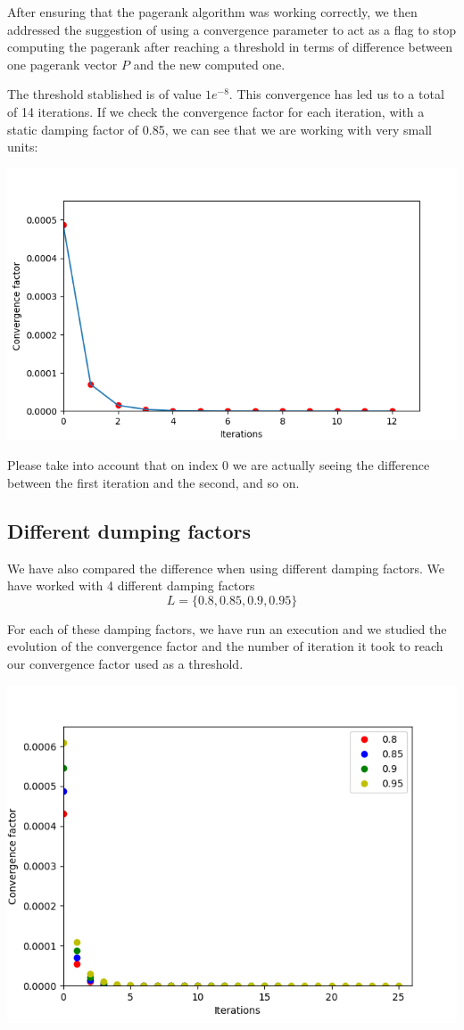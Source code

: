 \documentclass[10pt, a4paper]{article}
\begin{document}
\noindent After ensuring that the pagerank algorithm was working correctly, we then addressed the suggestion of using a convergence parameter to act as a flag to stop computing the pagerank after reaching a threshold in terms of difference between one pagerank vector $P$ and the new computed one.


The threshold stablished is of value  $1e^{-8}$.  This convergence has led us to a total of 14 iterations. If we check the convergence factor for each iteration, with a static damping factor of 0.85, we can see that we are working with very small units:
\begin{center}
        \includegraphics[width=0.75\linewidth]{plot_conv.png}
\end{center}

Please take into account that on index 0 we are actually seeing the difference between the first iteration and the second, and so on.

\subsection{Different dumping factors}

We have also compared the difference when using different damping factors. We have worked with 4 different damping factors $$L = \{0.8, 0.85, 0.9, 0.95\}$$

For each of these damping factors, we have run an execution and we studied the evolution of the convergence factor and the number of iteration it took to reach our convergence factor used as a threshold.

\begin{center}
    \includegraphics[width=0.7\linewidth]{damp_ev.png}
\end{center}
\end{document}
